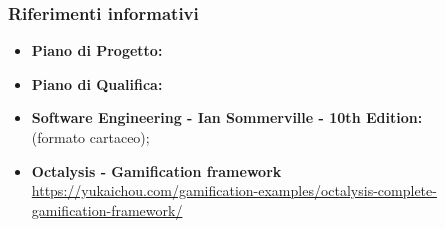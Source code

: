 \subsubsection {Riferimenti informativi}
\begin{itemize}
	\item \textbf{Piano di Progetto:}
	\item \textbf{Piano di Qualifica:}
	\item \textbf{Software Engineering - Ian Sommerville - 10th Edition: \\}(formato cartaceo);
	\item \textbf{Octalysis - Gamification framework \\}
	\href{https://yukaichou.com/gamification-examples/octalysis-complete-gamification-framework/}{https://yukaichou.com/gamification-examples/octalysis-complete-gamification-framework/} 
\end{itemize}